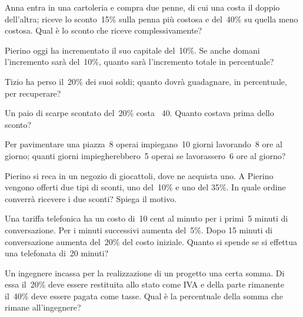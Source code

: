\begin{multicols}{2}
\begin{esercizio}%
 Anna entra in una cartoleria e compra due penne, di cui una costa il
doppio dell'altra; riceve lo sconto~15\% sulla penna
più costosa e del~40\% su quella meno costosa. Qual è lo sconto che
riceve complessivamente?
\end{esercizio}

\begin{esercizio}[\Ast]%
Pierino oggi ha incrementato il suo capitale del~10\%. Se anche
domani l'incremento sarà del~10\%, quanto sarà
l'incremento totale in percentuale?
\end{esercizio}

\begin{esercizio}%
Tizio ha perso il~20\% dei suoi soldi; quanto dovrà guadagnare, in
percentuale, per recuperare?
\end{esercizio}

\begin{esercizio}[\Ast]%
Un paio di scarpe scontato del~20\% costa \officialeuro~$40$. Quanto
costava prima dello sconto?
\end{esercizio}

\begin{esercizio}[\Ast]%
Per pavimentare una piazza~8 operai impiegano~10 giorni
lavorando~8 ore al giorno; quanti giorni impiegherebbero~5 operai se
lavorassero~6 ore al giorno?
\end{esercizio}

\begin{esercizio}%
Pierino si reca in un negozio di giocattoli, dove ne acquista uno. A
Pierino vengono offerti due tipi di sconti, uno del~10\% e uno del
35\%. In quale ordine converrà ricevere i due sconti? Spiega il
motivo.
\end{esercizio}

\begin{esercizio}[\Ast]%
Una tariffa telefonica ha un costo di~10 cent al minuto per i primi~5
minuti di conversazione. Per i minuti successivi aumenta del~5\%. Dopo
15 minuti di conversazione aumenta del~20\% del costo iniziale. Quanto
si spende se si effettua una telefonata di~20 minuti?
\end{esercizio}

\begin{esercizio}%
Un ingegnere incassa per la realizzazione di un progetto una
certa somma. Di essa il~20\% deve essere restituita allo stato come IVA
e della parte rimanente il~40\% deve essere pagata come tasse. Qual è
la percentuale della somma che rimane all'ingegnere?
\end{esercizio}


\end{multicols}
